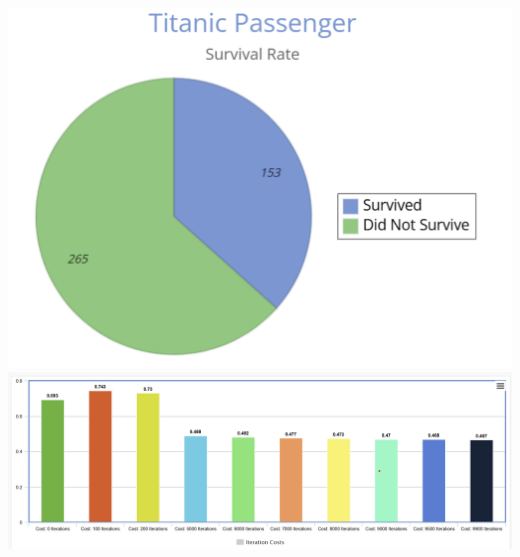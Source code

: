 \documentclass{IEEE}
\begin{document}
\includegraphics[scale=0.535]{./piechart.png}
\\ \includegraphics[scale=0.32]{./barchart.png}
\end{document}
